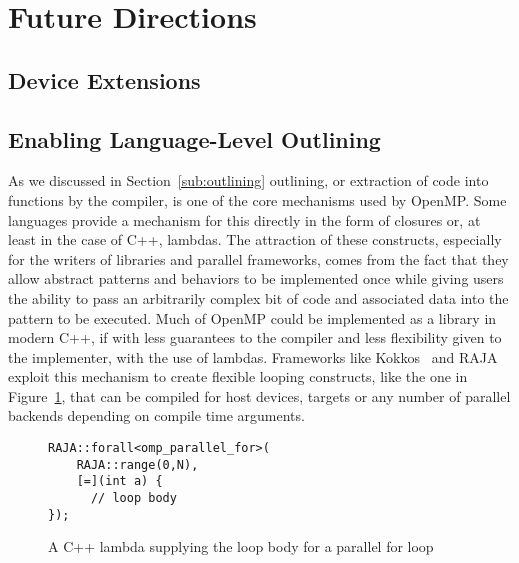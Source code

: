 \section{Future Directions}
\label{sec:future_directions}

\subsection{Device Extensions}
\label{sub:device_extensions}

\subsection{Enabling Language-Level Outlining}
\label{sub:enabling_language_level_outlining}

As we discussed in Section~\ref{sub:outlining} outlining, or extraction of code
into functions by the compiler, is one of the core mechanisms used by OpenMP.
Some languages provide a mechanism for this directly in the form of closures or,
at least in the case of C++, lambdas.  The attraction of these constructs,
especially for the writers of libraries and parallel frameworks, comes from the
fact that they allow abstract patterns and behaviors to be implemented once
while giving users the ability to pass an arbitrarily complex bit of code and
associated data into the pattern to be executed.  Much of OpenMP could be
implemented as a library in modern C++, if with less guarantees to the compiler
and less flexibility given to the implementer, with the use of lambdas.
Frameworks like Kokkos~\cite{kokkos} and RAJA~\cite{raja} exploit this mechanism
to create flexible looping constructs, like the one in Figure~\ref{fig:raja},
that can be compiled for host devices, targets or any number of parallel
backends depending on compile time arguments.

\begin{figure}
\begin{verbatim}
RAJA::forall<omp_parallel_for>(
    RAJA::range(0,N),
    [=](int a) {
      // loop body
});
\end{verbatim}
\caption{A C++ lambda supplying the loop body for a parallel for loop}
\label{fig:raja}
\end{figure}
   
